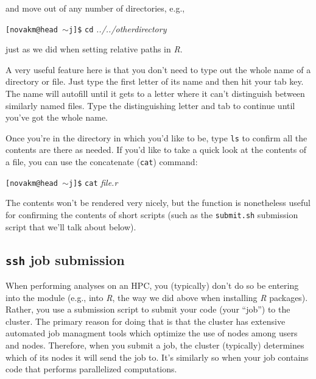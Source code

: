 \documentclass[12pt,letterpaper]{article}
\begin{document}
\noindent
and move out of any number of directories, e.g.,

\texttt{[novakm@head $\sim$j]\$}  \texttt{cd} \emph{../../otherdirectory}

\noindent
just as we did when setting relative paths in \emph{R}.

A very useful feature here is that you don't need to type out the whole name of a directory or file.
Just type the first letter of its name and then hit your tab key.
The name will autofill until it gets to a letter where it can't distinguish between similarly named files.
Type the distinguishing letter and tab to continue until you've got the whole name.

Once you're in the directory in which you'd like to be, type \texttt{ls} to confirm all the contents are there as needed.
If you'd like to take a quick look at the contents of a file, you can use the concatenate (\texttt{cat}) command:

\texttt{[novakm@head $\sim$j]\$} \texttt{cat} \emph{file.r}

\noindent
The contents won't be rendered very nicely, but the function is nonetheless useful for confirming the contents of short scripts (such as the \texttt{submit.sh} submission script that we'll talk about below).



\subsection{\texttt{ssh} job submission}
When performing analyses on an HPC, you (typically) don't do so be entering into the module (e.g., into \emph{R}, the way we did above when installing \emph{R} packages).
Rather, you use a submission script to submit your code (your ``job'') to the cluster.
The primary reason for doing that is that the cluster has extensive automated job managment tools which optimize the use of nodes among users and nodes.
Therefore, when you submit a job, the cluster (typically) determines which of its nodes it will send the job to.
It's similarly so when your job contains code that performs parallelized computations.
\end{document}
